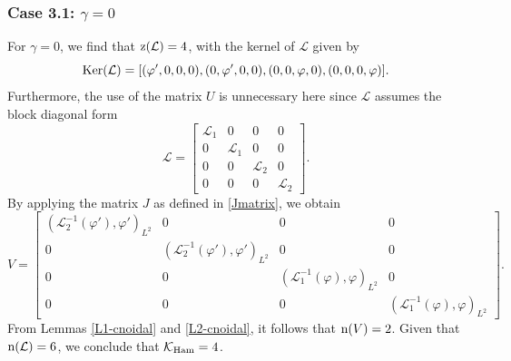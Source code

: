 \documentclass[10pt,reqno,a4paper]{amsart} %
\theoremstyle{definition} %
\numberwithin{equation}{section}
\numberwithin{figure}{section}
\begin{document}
\subsubsection*{Case 3.1: $\gamma = 0$} 
For $\gamma = 0$, we find that ${\rm z}(\mathcal{L}) = 4$, with the kernel of $\mathcal{L}$ given by
\begin{equation*}
    {\rm Ker}(\mathcal{L}) = [(\varphi',0,0,0), (0,\varphi',0,0), (0,0,\varphi,0), (0,0,0,\varphi)].
\end{equation*}
Furthermore, the use of the matrix $U$ is unnecessary here since $\mathcal{L}$ assumes the block diagonal form
\begin{equation*}
    \mathcal{L} = \begin{bmatrix}

        \mathcal{L}_1 & 0 & 0 & 0 \\

        0 & \mathcal{L}_1 & 0 & 0 \\

        0 & 0 & \mathcal{L}_2 & 0 \\

        0 & 0 & 0 & \mathcal{L}_2

    \end{bmatrix}.
\end{equation*}
By applying the matrix $J$ as defined in \eqref{Jmatrix}, we obtain
\begin{equation*}
    V = \begin{bmatrix}
        \left(\mathcal{L}_2^{-1} (\varphi'), \varphi'\right)_{L^2} & 0 & 0 & 0 \\
        0 & \left(\mathcal{L}_2^{-1} (\varphi'), \varphi'\right)_{L^2} & 0 & 0 \\
        0 & 0 & \left(\mathcal{L}_1^{-1} (\varphi), \varphi\right)_{L^2} & 0 \\
        0 & 0 & 0 & \left(\mathcal{L}_1^{-1} (\varphi), \varphi\right)_{L^2}
    \end{bmatrix}.
\end{equation*}
From Lemmas \ref{L1-cnoidal} and \ref{L2-cnoidal}, it follows that ${\rm n}(V) = 2$. Given that ${\rm n}(\mathcal{L}) = 6$, we conclude that $\mathcal{K}_{\rm Ham} = 4$.
\end{document}
